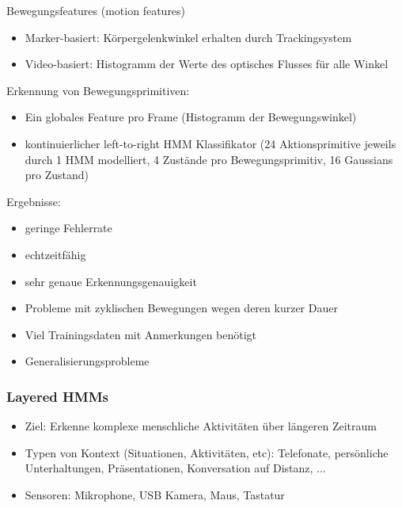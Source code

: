 \documentclass[paper=a4, fontsize=11pt]{scrartcl} %
\numberwithin{equation}{section} %
\numberwithin{figure}{section} %
\numberwithin{table}{section} %
\begin{document}
Bewegungsfeatures (motion features)
\begin{itemize}
\item Marker-basiert: Körpergelenkwinkel erhalten durch Trackingsystem
\item Video-basiert: Histogramm der Werte des optisches Flusses für alle Winkel
\end{itemize}

Erkennung von Bewegungsprimitiven:
\begin{itemize}
\item Ein globales Feature pro Frame (Histogramm der Bewegungswinkel)
\item kontinuierlicher left-to-right HMM Klassifikator (24 Aktionsprimitive jeweils durch 1 HMM modelliert, 4 Zustände pro Bewegungsprimitiv, 16 Gaussians pro Zustand)
\end{itemize}

Ergebnisse:
\begin{itemize}
\item geringe Fehlerrate
\item echtzeitfähig
\item sehr genaue Erkennungsgenauigkeit
\item Probleme mit zyklischen Bewegungen wegen deren kurzer Dauer
\item Viel Trainingsdaten mit Anmerkungen benötigt
\item Generalisierungsprobleme
\end{itemize}

\subsubsection{Layered HMMs}

\begin{itemize}
\item Ziel: Erkenne komplexe menschliche Aktivitäten über längeren Zeitraum
\item Typen von Kontext (Situationen, Aktivitäten, etc): Telefonate, persönliche Unterhaltungen, Präsentationen, Konversation auf Distanz, ...
\item Sensoren: Mikrophone, USB Kamera, Maus, Tastatur
\end{itemize}
\end{document}
